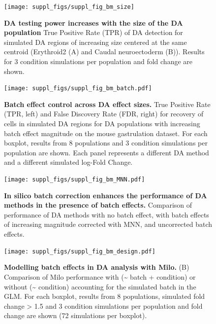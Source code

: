 \documentclass[
]{article}
\begin{document}
\begin{figure}
\texttt{[image: suppl\_figs/suppl\_fig\_bm\_size]} \caption{\textbf{DA testing power increases with the size of the DA population} True Positive Rate (TPR) of DA detection for simulated DA regions of increasing size centered at the same centroid (Erythroid2 (A) and Caudal neuroectoderm (B)). Results for 3 condition simulations per population and fold change are shown.}\label{fig:sup-fig-bm-size}
\end{figure}



\begin{figure}
\centering
\texttt{[image: suppl\_figs/suppl\_fig\_bm\_batch.pdf]}
\caption{\label{fig:sup-fig-bm-batch}\textbf{Batch effect control across DA effect sizes.} True Positive Rate (TPR, left) and False Discovery Rate (FDR, right) for recovery of cells in simulated DA regions for DA populations with increasing batch effect magnitude on the mouse gastrulation dataset. For each boxplot, results from 8 populations and 3 condition simulations per population are shown. Each panel represents a different DA method and a different simulated log-Fold Change.}
\end{figure}



\begin{figure}
\centering
\texttt{[image: suppl\_figs/suppl\_fig\_bm\_MNN.pdf]}
\caption{\label{fig:sup-fig-bm-mnn}\textbf{In silico batch correction enhances the performance of DA methods in the presence of batch effects.} Comparison of performance of DA methods with no batch effect, with batch effects of increasing magnitude corrected with MNN, and uncorrected batch effects.}
\end{figure}



\begin{figure}
\centering
\texttt{[image: suppl\_figs/suppl\_fig\_bm\_design.pdf]}
\caption{\label{fig:sup-fig-bm-design}\textbf{Modelling batch effects in DA analysis with Milo.} (B) Comparison of Milo performance with (\textasciitilde{} batch + condition) or without (\textasciitilde{} condition) accounting for the simulated batch in the GLM. For each boxplot, results from 8 populations, simulated fold change \textgreater{} 1.5 and 3 condition simulations per population and fold change are shown (72 simulations per boxplot).}
\end{figure}
\end{document}

